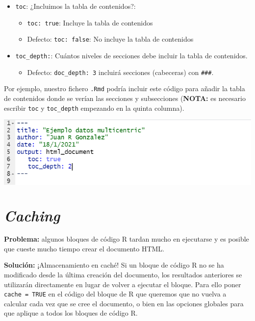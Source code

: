 \documentclass[
]{book}
\providecommand{\tightlist}{%
  \setlength{\itemsep}{0pt}\setlength{\parskip}{0pt}}
\begin{document}
\begin{itemize}
\tightlist
\item
  \texttt{toc}: ¿Incluimos la tabla de contenidos?:

  \begin{itemize}
  \tightlist
  \item
    \texttt{toc:\ true}: Incluye la tabla de contenidos
  \item
    Defecto: \texttt{toc:\ false}: No incluye la tabla de contenidos
  \end{itemize}
\item
  \texttt{toc\_depth:}: Cuántos niveles de secciones debe incluir la tabla de contenidos.

  \begin{itemize}
  \tightlist
  \item
    Defecto: \texttt{doc\_depth:\ 3} incluirá secciones (cabeceras) con \texttt{\#\#\#}.
  \end{itemize}
\end{itemize}

Por ejemplo, nuestro fichero \texttt{.Rmd} podría incluir este código para añadir la tabla de contenidos donde se verían las secciones y subsecciones (\textbf{NOTA:} es necesario escribir \texttt{toc} y \texttt{toc\_depth} empezando en la quinta columna).

\includegraphics{figures/toc.png}

\hypertarget{caching}{%
\section{\texorpdfstring{\emph{Caching}}{Caching}}\label{caching}}

\textbf{Problema:} algunos bloques de código R tardan mucho en ejecutarse y es posible que cueste mucho tiempo crear el documento HTML.

\textbf{Solución:} ¡Almacenamiento en caché! Si un bloque de código R no se ha modificado desde la última creación del documento, los resultados anteriores se utilizarán directamente en lugar de volver a ejecutar el bloque. Para ello poner \texttt{cache\ =\ TRUE} en el código del bloque de R que queremos que no vuelva a calcular cada vez que se cree el documento, o bien en las opciones globales para que aplique a todos los bloques de código R.
\end{document}
